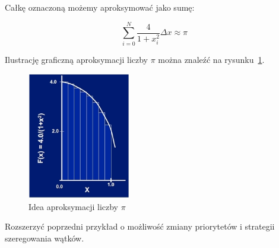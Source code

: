 \begin{myenumerate}
Całkę oznaczoną możemy aproksymować jako sumę:

\begin{equation}\nonumber
\sum_{i=0}^N\frac{4}{1+x_i^2}\Delta x\approx\pi
\end{equation}

Ilustrację graficzną aproksymacji liczby $\pi$ można znaleźć na rysunku~\ref{fig:piApprox}.

\begin{figure}[!h]
\centering
\includegraphics[width=0.4\textwidth]{img/piApprox}
\caption{Idea aproksymacji liczby $\pi$}
\label{fig:piApprox}
\end{figure}



\item Rozszerzyć poprzedni przykład o możliwość zmiany priorytetów i strategii szeregowania wątków.
\end{myenumerate}


\cleardoublepage
